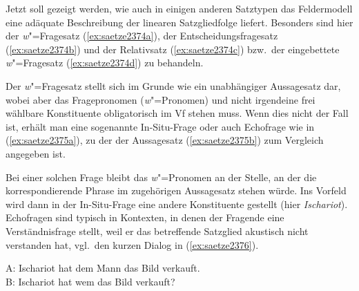
Jetzt soll gezeigt werden, wie auch in einigen anderen Satztypen das Feldermodell eine adäquate Beschreibung der linearen Satzgliedfolge liefert.
Besonders sind hier der \textit{w}"=Fragesatz (\ref{ex:saetze2374a}), der Entscheidungsfragesatz (\ref{ex:saetze2374b}) und der Relativsatz (\ref{ex:saetze2374c}) bzw.\ der eingebettete \textit{w}"=Fragesatz (\ref{ex:saetze2374d}) zu behandeln.

\begin{exe}
  \ex\label{ex:saetze2374} 
  \begin{xlist}
  \end{xlist}
\end{exe}

\label{abs:923478} Der \textit{w}"=Fragesatz stellt sich im Grunde wie ein unabhängiger Aussagesatz dar, wobei aber das Fragepronomen (\textit{w}"=Pronomen) und nicht irgendeine frei wählbare Konstituente obligatorisch im Vf stehen muss.
Wenn dies nicht der Fall ist, erhält man eine sogenannte In-Situ-Frage oder auch Echofrage wie in (\ref{ex:saetze2375a}), zu der der Aussagesatz (\ref{ex:saetze2375b}) zum Vergleich angegeben ist.

\begin{exe}
  \ex\label{ex:saetze2375}
  \begin{xlist}
  \end{xlist}
\end{exe}

Bei einer solchen Frage bleibt das \textit{w}"=Pronomen an der Stelle, an der die korrespondierende Phrase im zugehörigen Aussagesatz stehen würde.
Ins Vorfeld wird dann in der In-Situ-Frage eine andere Konstituente gestellt (hier \zB \textit{Ischariot}).
Echofragen sind typisch in Kontexten, in denen der Fragende eine Verständnisfrage stellt, weil er das betreffende Satzglied \zB akustisch nicht verstanden hat, vgl.\ den kurzen Dialog in (\ref{ex:saetze2376}).

\begin{exe}
  \ex\label{ex:saetze2376} A: Ischariot hat dem Mann das Bild verkauft.\\
  B: Ischariot hat wem das Bild verkauft?
\end{exe}


